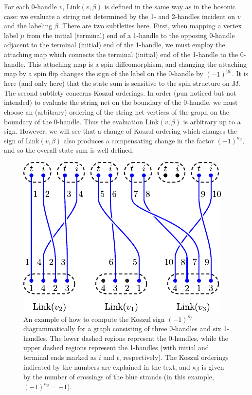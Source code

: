 For each 0-handle $v$, $\text{Link}(v,\beta)$ is defined in the same way as in the bosonic case:
we evaluate a string net determined by the 1- and 2-handles incident on $v$ and the labeling $\beta$.
There are two subtleties here.
First, when mapping a vertex label $\mu$ from the initial (terminal) end of a 1-handle to the opposing 0-handle adjacent to the terminal (initial) end of the 1-handle, 
we must employ the attaching map which connects the terminal (initial) end of the 1-handle to the 0-handle.
This attaching map is a spin diffeomorphism, 
and changing the attaching map by a spin flip changes the sign
of the label on the 0-handle by $(-1)^{|\mu|}$.
It is here (and only here) that the state sum is sensitive to the spin structure on $M$.
The second subtlety concerns Koszul orderings.
In order (pun noticed but not intended)
to evaluate the string net on the boundary of the 0-handle, we must choose an (arbitrary) ordering
of the string net vertices of the graph on the boundary of the 0-handle.
Thus the evaluation $\text{Link}(v, \beta)$ is arbitrary up to a sign.
However, we will see that a change of Koszul ordering which changes the sign of $\text{Link}(v, \beta)$ also produces a compensating
change in the factor $(-1)^{\kappa_\beta}$, and so the overall state sum is well defined.

\begin{figure} 
\centering
\includegraphics{KoszulFig.pdf} 
\caption{\label{KoszulFig} 
An example of how to compute the Koszul sign $(-1)^{\kappa_\beta}$ diagrammatically  
for a graph consisting of three 0-handles and six 1-handles. 
The lower dashed regions represent the 0-handles, while the upper dashed regions 
represent the 1-handles (with initial and terminal ends marked as $i$ and $t$, respectively). 
The Koszul orderings indicated by the numbers are explained in the text, and 
$\kappa_\beta$ is given by the number of crossings of the blue strands (in this example, 
$(-1)^{\kappa_\beta}=-1$).
}
\end{figure}


